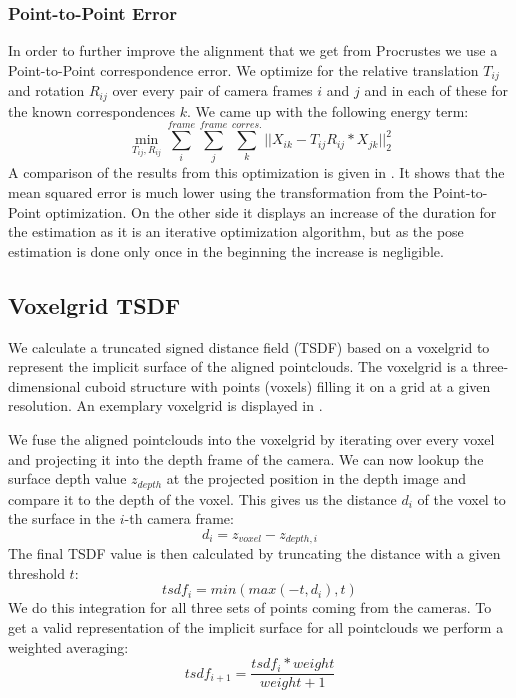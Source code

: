 \documentclass[10pt,twocolumn,letterpaper]{article}
\begin{document}
\subsubsection{Point-to-Point Error}
In order to further improve the alignment that we get from Procrustes we use a Point-to-Point correspondence error. We optimize for the relative translation $T_{ij}$ and rotation $R_{ij}$ over every pair of camera frames $i$ and $j$ and in each of these for the known correspondences $k$. We came up with the following energy term:
\begin{equation}\label{eq5}
\min_{T_{ij}, R_{ij}} \sum_{i}^{frame}\sum_{j}^{frame}\sum_{k}^{corres.} || X_{ik} - T_{ij}R_{ij}*X_{jk} ||_2^2
\end{equation}
A comparison of the results from this optimization is given in . It shows that the mean squared error is much lower using the transformation from the Point-to-Point optimization. On the other side it displays an increase of the duration for the estimation as it is an iterative optimization algorithm, but as the pose estimation is done only once in the beginning the increase is negligible.
%
\subsection{Voxelgrid TSDF}
We calculate a truncated signed distance field (TSDF) based on a voxelgrid to represent the implicit surface of the aligned pointclouds. The voxelgrid is a three-dimensional cuboid structure with points (voxels) filling it on a grid at a given resolution. An exemplary voxelgrid is displayed in . 

We fuse the aligned pointclouds into the voxelgrid by iterating over every voxel and projecting it into the depth frame of the camera. We can now lookup the surface depth value $z_{depth}$ at the projected position in the depth image and compare it to the depth of the voxel. This gives us the distance $d_i$ of the voxel to the surface in the $i$-th camera frame:
\begin{equation}\label{eq1}
d_i = z_{voxel} - z_{depth,i}
\end{equation}
The final TSDF value is then calculated by truncating the distance with a given threshold $t$:
\begin{equation}
	tsdf_i = min(max(-t, d_i), t)
\end{equation}
We do this integration for all three sets of points coming from the cameras. To get a valid representation of the implicit surface for all pointclouds we perform a weighted averaging: 
\begin{equation}\label{eq2}
tsdf_{i+1}=\frac{tsdf_{i} * weight}{weight+1}
\end{equation}
\end{document}
